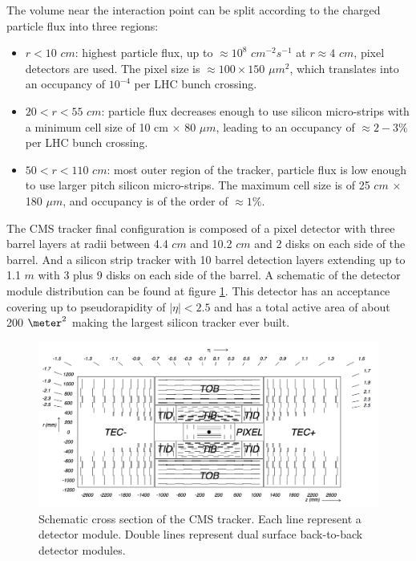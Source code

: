 The volume near the interaction point can be split according to the charged particle flux into three regions:

\begin{itemize}
  \item $r<10$ $cm$: highest particle flux, up to $\approx 10^8 $ $cm^{-2}s^{-1}$ at $r \approx 4$ $cm$, pixel detectors are used. The pixel size is $\approx 100 \times 150$ $\mu m^2$, which translates into an occupancy of $10^{-4}$ per \gls{LHC} bunch crossing.
  \item $20<r<55$ $cm$: particle flux decreases enough to use silicon micro-strips with a minimum cell size of 10 cm $\times$ 80 $\mu m$, leading to an occupancy of $\approx 2-3\%$ per \gls{LHC} bunch crossing.
  \item $50<r<110$ $cm$: most outer region of the tracker, particle flux is low enough to use larger pitch silicon micro-strips. The maximum cell size is of 25 $cm$ $\times$ 180 $\mu m$, and occupancy is of the order of $\approx 1\%$.
\end{itemize}

The \gls{CMS} tracker final configuration is composed of a pixel detector with three barrel layers at radii between 4.4 $cm$ and 10.2 $cm$ and 2 disks on each side of the barrel. And a silicon strip tracker with 10 barrel detection layers extending up to 1.1 $m$ with 3 plus 9 disks on each side of the barrel. A schematic of the detector module distribution can be found at figure \ref{FIGURE:ExperimentalApparatus_CMS_Tracker_Layout}. This detector has an acceptance covering up to pseudorapidity of $|\eta|<2.5$ and has a total active area of about 200 $\meter^2$ making the largest silicon tracker ever built. 

\begin{figure}[!htb]
  \centering
  \includegraphics[width=1.0\textwidth]{Chapter02/CMS/Images/CMS_Tracker_Layout.png}
  \caption{Schematic cross section of the CMS tracker. Each line represent a detector module. Double lines represent dual surface back-to-back detector modules.}
  \label{FIGURE:ExperimentalApparatus_CMS_Tracker_Layout}
\end{figure}

